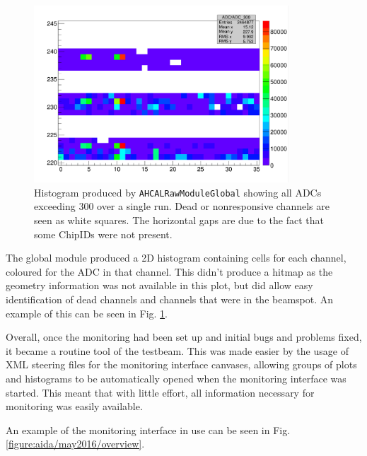 \begin{figure}[p]
	\centering
	\includegraphics[width=0.85\textwidth]{../Pictures/GlobalModule-May2016.png} %
	\caption{Histogram produced by \texttt{AHCALRawModuleGlobal} showing all ADCs exceeding 300 over a single run. Dead or nonresponsive channels are seen as white squares. The horizontal gaps are due to the fact that some ChipIDs were not present.}
	\label{figure:aida/may2016/globalmodule}
\end{figure}

The global module produced a 2D histogram containing cells for each channel, coloured for the \acrshort{ADC} in that channel. This didn't produce a hitmap as the geometry information was not available in this plot, but did allow easy identification of dead channels and channels that were in the beamspot. An example of this can be seen in Fig. \ref{figure:aida/may2016/globalmodule}.

Overall, once the monitoring had been set up and initial bugs and problems fixed, it became a routine tool of the testbeam. This was made easier by the usage of XML steering files for the monitoring interface canvases, allowing groups of plots and histograms to be automatically opened when the monitoring interface was started. This meant that with little effort, all information necessary for monitoring was easily available.

An example of the monitoring interface in use can be seen in Fig. \ref{figure:aida/may2016/overview}.

